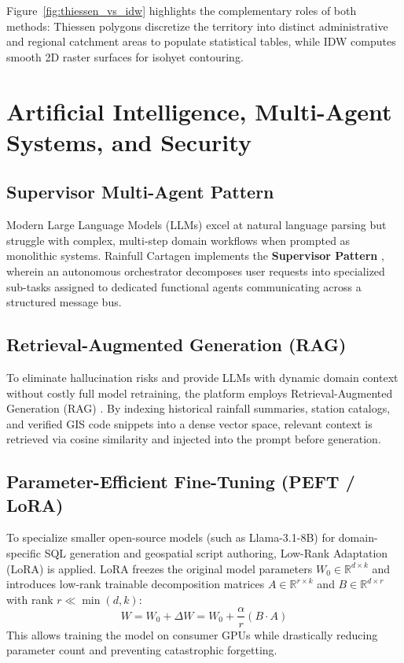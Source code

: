 \documentclass[12pt,a4paper]{report}
\begin{document}
Figure~\ref{fig:thiessen_vs_idw} highlights the complementary roles of both methods: Thiessen polygons discretize the territory into distinct administrative and regional catchment areas to populate statistical tables, while IDW computes smooth 2D raster surfaces for isohyet contouring.

\section{Artificial Intelligence, Multi-Agent Systems, and Security}

\subsection{Supervisor Multi-Agent Pattern}
Modern Large Language Models (LLMs) excel at natural language parsing but struggle with complex, multi-step domain workflows when prompted as monolithic systems. Rainfull Cartagen implements the \textbf{Supervisor Pattern} \cite{wooldridge2009}, wherein an autonomous orchestrator decomposes user requests into specialized sub-tasks assigned to dedicated functional agents communicating across a structured message bus.

\subsection{Retrieval-Augmented Generation (RAG)}
To eliminate hallucination risks and provide LLMs with dynamic domain context without costly full model retraining, the platform employs Retrieval-Augmented Generation (RAG) \cite{lewis2020}. By indexing historical rainfall summaries, station catalogs, and verified GIS code snippets into a dense vector space, relevant context is retrieved via cosine similarity and injected into the prompt before generation.

\subsection{Parameter-Efficient Fine-Tuning (PEFT / LoRA)}
To specialize smaller open-source models (such as Llama-3.1-8B) for domain-specific SQL generation and geospatial script authoring, Low-Rank Adaptation (LoRA) \cite{hu2021} is applied. LoRA freezes the original model parameters $W_0 \in \mathbb{R}^{d \times k}$ and introduces low-rank trainable decomposition matrices $A \in \mathbb{R}^{r \times k}$ and $B \in \mathbb{R}^{d \times r}$ with rank $r \ll \min(d, k)$:
\begin{equation}
W = W_0 + \Delta W = W_0 + \frac{\alpha}{r} (B \cdot A)
\label{eq:lora}
\end{equation}
This allows training the model on consumer GPUs while drastically reducing parameter count and preventing catastrophic forgetting.
\end{document}
